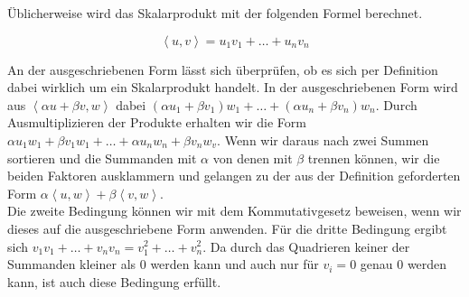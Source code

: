 Üblicherweise wird das Skalarprodukt mit der folgenden Formel berechnet.

\begin{equation*}
\left\langle u,v\right\rangle  = u_1 v_1 + \dots + u_n v_n
\end{equation*}

An der ausgeschriebenen Form lässt sich überprüfen, ob es sich per Definition dabei wirklich um ein Skalarprodukt handelt. In der ausgeschriebenen Form wird aus $\left\langle \alpha u + \beta v, w\right\rangle $ dabei $(\alpha u_1 + \beta v_1) w_1 + \dots + (\alpha u_n + \beta v_n) w_n$. Durch Ausmultiplizieren der Produkte erhalten wir die Form $\alpha u_1 w_1 + \beta v_1 w_1 + \dots + \alpha u_n w_n +\beta v_n w_v$. Wenn wir daraus nach zwei Summen sortieren und die Summanden mit $\alpha$ von denen mit $\beta$ trennen können, wir die beiden Faktoren ausklammern und gelangen zu der aus der Definition geforderten Form $\alpha \left\langle u,w\right\rangle  + \beta \left\langle v,w\right\rangle $.\\
Die zweite Bedingung können wir mit dem Kommutativgesetz beweisen, wenn wir dieses auf die ausgeschriebene Form anwenden.
Für die dritte Bedingung ergibt sich $v_1 v_1 + \dots + v_n v_n = v_1^2 + \dots + v_n^2$. Da durch das Quadrieren keiner der Summanden kleiner als 0 werden kann und auch nur für $v_i = 0$ genau 0 werden kann, ist auch diese Bedingung erfüllt.\\



